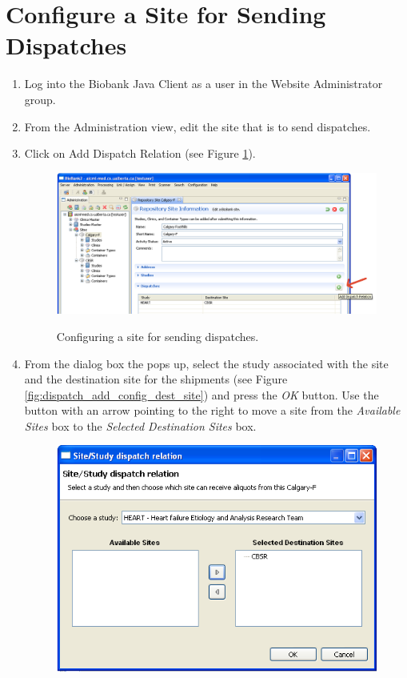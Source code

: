 \section{Configure a Site for Sending Dispatches}
\label{sec:config_send}
\begin{enumerate}
  \item Log into the Biobank Java Client as a user in the Website
    Administrator group.
  \item From the Administration view, edit the site that is to send dispatches.
  \item \label{add_dispatch} Click on Add Dispatch Relation (see Figure
    \ref{fig:dispatch_add_configuration}).
    \begin{figure}[H]
      \centering
      \scalebox{0.5}
      { \includegraphics*{screenshots/dispatch/add_config} }
      \caption{Configuring a site for sending dispatches.}
      \label{fig:dispatch_add_configuration}
    \end{figure}
  \item From the dialog box the pops up, select the study associated with the
    site and the destination site for the shipments (see Figure
    \ref{fig:dispatch_add_config_dest_site}) and press the \emph{OK}
    button. Use the button with an arrow pointing to the right to move a site
    from the \emph{Available Sites} box to the \emph{Selected Destination Sites}
    box.
    \begin{figure}[H]
      \centering
      \scalebox{0.5}
      { \includegraphics*{screenshots/dispatch/add_config_dest_site} }

\end{figure}
\end{enumerate}
